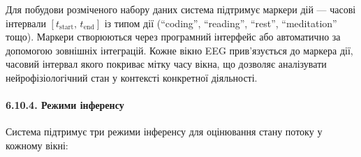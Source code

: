 \documentclass[12pt,a4paper]{article}
\begin{document}
Для побудови розміченого набору даних система підтримує маркери дій --- часові інтервали \([t_{\text{start}},\,t_{\text{end}}]\) із типом дії (``coding'', ``reading'', ``rest'', ``meditation'' тощо). Маркери створюються через програмний інтерфейс або автоматично за допомогою зовнішніх інтеграцій. Кожне вікно EEG прив'язується до маркера дії, часовий інтервал якого покриває мітку часу вікна, що дозволяє аналізувати нейрофізіологічний стан у контексті конкретної діяльності.



\paragraph{6.10.4. Режими інференсу}\label{ux440ux435ux436ux438ux43cux438-ux456ux43dux444ux435ux440ux435ux43dux441ux443}



Система підтримує три режими інференсу для оцінювання стану потоку у кожному вікні:
\end{document}
